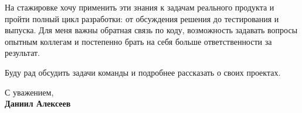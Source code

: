 \documentclass[11pt,a4paper]{article}
\begin{document}
На стажировке хочу применить эти знания к задачам реального продукта и пройти полный цикл разработки: от обсуждения решения до тестирования и выпуска. Для меня важны обратная связь по коду, возможность задавать вопросы опытным коллегам и постепенно брать на себя больше ответственности за результат.

Буду рад обсудить задачи команды и подробнее рассказать о своих проектах.

\vspace{0.3em}
С уважением,\\[0.25em]
\textbf{Даниил Алексеев}
\end{document}
